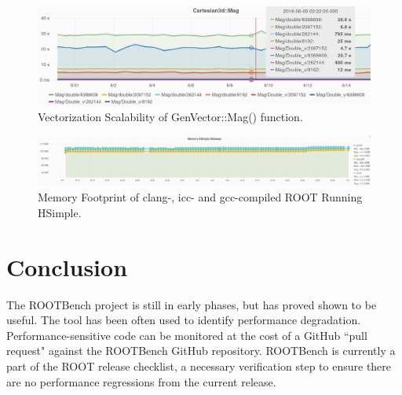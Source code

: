 \documentclass{webofc}
\begin{document}
\begin{figure}[h]
\centering
\includegraphics[width=\linewidth]{pictures/genvector.png}
\caption{Vectorization Scalability of GenVector::Mag() function.}
\label{fig:genvec}
\end{figure}

\begin{figure}[h]
\centering
\includegraphics[width=\linewidth]{pictures/7.png}
\caption{Memory Footprint of clang-, icc- and gcc-compiled ROOT Running HSimple.}
\label{fig:compilers}
\end{figure}


\section {Conclusion} \label{sec:conclusions}

The ROOTBench project is still in early phases, but has proved shown to be useful. The tool has been often used to identify performance degradation. Performance-sensitive code can be monitored at the cost of a GitHub ``pull request" against the ROOTBench GitHub repository. ROOTBench is currently a part of the ROOT release checklist, a necessary verification step to ensure there are no performance regressions from the current release. 
\end{document}
